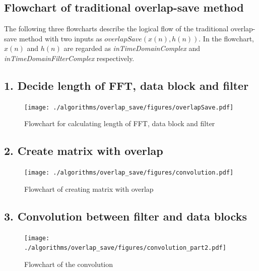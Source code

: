 \subsection*{Flowchart of traditional overlap-save method}
The following three flowcharts describe the logical flow of the traditional overlap-save method with two inputs as $overlapSave(x(n), h(n))$. In the flowchart, $x(n)$ and $h(n)$ are regarded as \textit{inTimeDomainComplex} and  \textit{inTimeDomainFilterComplex} respectively.
\subsection*{1. Decide length of FFT, data block and filter}
\begin{figure}[h]
	\centering
	\texttt{[image: ./algorithms/overlap\_save/figures/overlapSave.pdf]}
	\caption{Flowchart for calculating length of FFT, data block and filter}
	\label{overlapSave_length}
\end{figure}

\newpage
\subsection*{2. Create matrix with overlap}
\begin{figure}[h]
	\centering
	\texttt{[image: ./algorithms/overlap\_save/figures/convolution.pdf]}
	\caption{Flowchart of creating matrix with overlap}
	\label{createMatrix}
\end{figure}

\newpage
\subsection*{3. Convolution between filter and data blocks}
\begin{figure}[h]
	\centering
	\texttt{[image: ./algorithms/overlap\_save/figures/convolution\_part2.pdf]}
	\caption{Flowchart of the convolution}
	\label{convolution_part2}
\end{figure}


\newpage
